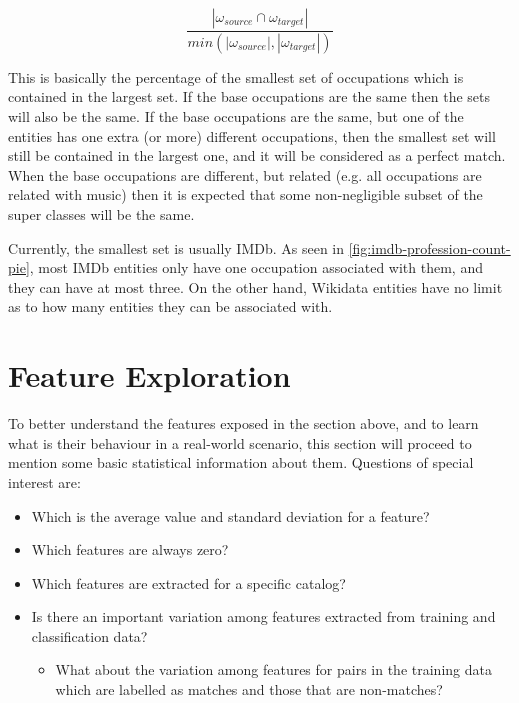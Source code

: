 \documentclass[epsfig,a4paper,11pt,titlepage,twoside,openany]{book}
\begin{document}
\begin{equation*}
    \frac{
        | \omega_{source} \cap \omega_{target} | 
    }{
        min(| \omega_{source} | , | \omega_{target} | )
    }
\end{equation*}

This is basically the percentage of the smallest set of occupations which is contained in the largest set. If the base occupations are the same then the sets will also be the same. If the base occupations are the same, but one of the entities has one extra (or more) different occupations, then the smallest set will still be contained in the largest one, and it will be considered as a perfect match. When the base occupations are different, but related (e.g. all occupations are related with music) then it is expected that some non-negligible subset of the super classes will be the same.

Currently, the smallest set is usually IMDb. As seen in \autoref{fig:imdb-profession-count-pie}, most IMDb entities only have one occupation associated with them, and they can have at most three. On the other hand, Wikidata entities have no limit as to how many entities they can be associated with. 


\section{Feature Exploration}
\label{sec:feature-viz}

To better understand the features exposed in the section above, and to learn what is their behaviour in a real-world scenario, this section will proceed to mention some basic statistical information about them. Questions of special interest are:

\begin{itemize}
    \item Which is the average value and standard deviation for a feature?
    \item Which features are always zero?
    \item Which features are extracted for a specific catalog?
    \item Is there an important variation among features extracted from training and classification data?
    \begin{itemize}
        \item What about the variation among features for pairs in the training data which are labelled as matches and those that are non-matches?
    \end{itemize}
\end{itemize}
\end{document}
